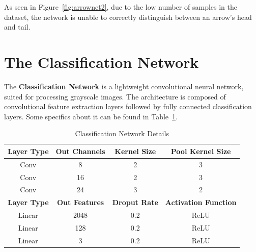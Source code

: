 \documentclass[conference]{IEEEtran}
\begin{document}
\begin{appendices}
As seen in Figure~\ref{fig:arrownet2}, due to the low number of samples in the dataset, the network is unable to correctly distinguish between an arrow's head and tail.

\section{The Classification Network}
\label{classification_net}

The \textbf{Classification Network} is a lightweight convolutional neural network, suited for processing grayscale images. The architecture is composed of convolutional feature extraction layers followed by fully connected classification layers. Some specifics about it can be found in Table~\ref{tab:classification-architecture}.

\begin{table}[h]
	\centering
	\caption{Classification Network Details}
	\label{tab:classification-architecture}
	\begin{tabular}{|c|c|c|c|}
		\hline
		\textbf{Layer Type} & \textbf{Out Channels} & \textbf{Kernel Size} & \textbf{Pool Kernel Size} \\
		\hline 
		Conv & 8 & 2 & 3 \\
		Conv & 16 & 2  & 3 \\
		Conv & 24 & 3  & 2 \\
		\hline
		\textbf{Layer Type} & \textbf{Out Features} & \textbf{Droput Rate} & \textbf{Activation Function} \\
		\hline 
		Linear & 2048 & 0.2 & ReLU \\
		Linear & 128 & 0.2 & ReLU \\
		Linear & 3 & 0.2 & ReLU \\
		\hline
	\end{tabular}
\end{table}

\end{appendices}
\end{document}
